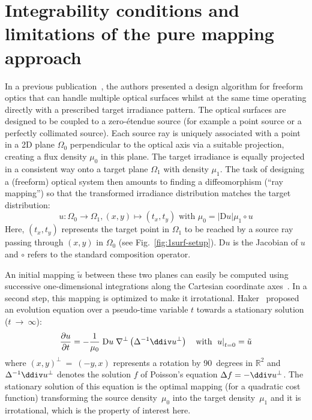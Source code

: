 
\section{Integrability conditions and limitations of the pure mapping approach}

In a previous publication~\cite{Baeuerle2012}, the authors
presented a design algorithm for freeform optics that can handle
multiple optical surfaces whilst at the same time operating directly
with a prescribed target irradiance pattern.  The optical surfaces are
designed to be coupled to a zero-\'{e}tendue source (for example a point
source or a perfectly collimated source). Each source ray is uniquely
associated with a point in a 2D plane $\Omega_0$ perpendicular to the
optical axis via a suitable projection, creating a flux density
$\mu_0$ in this plane. The target irradiance is equally projected in a
consistent way onto a target plane $\Omega_1$ with density
$\mu_1$. The task of designing a (freeform) optical system then
amounts to finding a diffeomorphism (``ray mapping'') so that the
transformed irradiance distribution matches the target distribution:
\begin{equation}
  u:\Omega_0\to\Omega_1, (x,y)\mapsto(t_x,t_y)\text{~with~}\mu_0=|\mathrm{D}u|\mu_1\circ u
\end{equation}
Here, $(t_x,t_y)$ represents the target point in $\Omega_1$ to be
reached by a source ray passing through $(x,y)$ in $\Omega_0$ (see
Fig.~\ref{fig:1surf-setup}). $\mathrm{D}u$ is the Jacobian of $u$ and
$\circ$ refers to the standard composition operator.

An initial mapping $\tilde{u}$ between these two planes can easily be
computed using successive one-dimensional integrations along the
Cartesian coordinate axes~\cite{Parkyn1998}. In a second step, this
mapping is optimized to make it irrotational. Haker~\cite{Haker2004}
proposed an evolution equation over a pseudo-time variable $t$ towards
a stationary solution ($t~\to~\infty$):
\begin{equation}
  \pderiv{u}{t} = -\frac{1}{\mu_0} \; {\rm D} u\; \nabla^\bot \left( \Delta^{-1}\ddiv  u^\bot \right)\text{\quad with } \left.u\right|_{t=0}=\tilde{u}
  \label{eq:haker-ev}
\end{equation}
where $(x,y)^\bot~=~(-y,x)$ represents a rotation by 90~degrees in
$\mathbb{R}^2$ and $\Delta^{-1}\ddiv u^\bot$ denotes the solution $f$
of Poisson's equation $ \Delta f = -\ddiv u^\bot $.  The stationary
solution of this equation is the optimal mapping (for a quadratic cost
function) transforming the source density~$\mu_0$ into the target
density~$\mu_1$ and it is irrotational, which is the property of
interest here.


